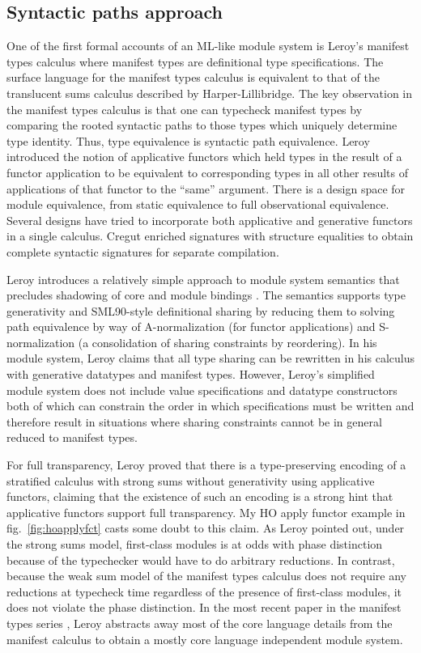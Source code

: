 \documentclass[12pt]{article}
\begin{document}
\subsection{Syntactic paths approach}
One of the first formal accounts of an ML-like module system is Leroy's manifest types calculus\cite{leroy94} where manifest types are definitional type specifications. The surface language for the manifest types calculus is equivalent to that of the translucent sums calculus described by Harper-Lillibridge. The key observation in the manifest types calculus is that one can typecheck manifest types by comparing the rooted syntactic paths to those types which uniquely determine type identity. Thus, type equivalence is syntactic path equivalence. Leroy introduced the notion of applicative functors which held types in the result of a functor application to be equivalent to corresponding types in all other results of applications of that functor to the ``same'' argument\cite{leroy95}. There is a design space for module equivalence, from static equivalence to full observational equivalence. Several designs \cite{shao99,dhc03,russothesis} have tried to incorporate both applicative and generative functors in a single calculus. Cregut \cite{CregutMacQueen94} enriched signatures with structure equalities to obtain complete syntactic signatures for separate compilation.

Leroy introduces a relatively simple approach to module system semantics that precludes shadowing of core and module bindings \cite{Leroy:generativity,leroy00}.
The semantics supports type generativity and SML90-style definitional sharing by reducing them to solving path equivalence by way of A-normalization (for functor applications) and S-normalization (a consolidation of sharing constraints by reordering). In his module system, Leroy claims that all type sharing can be rewritten in his calculus with generative datatypes and manifest types. However, Leroy's simplified module system does not include value specifications and datatype constructors both of which can constrain the order in which specifications must be written and therefore result in situations where sharing constraints cannot be in general reduced to manifest types. 

For full transparency, Leroy proved that there is a type-preserving encoding of a stratified calculus with strong sums without generativity using applicative functors\cite{leroy95}, claiming that the existence of such an encoding is a strong hint that applicative functors support full transparency. My HO apply functor example in fig.~\ref{fig:hoapplyfct} casts some doubt to this claim. As Leroy pointed out, under the strong sums model, first-class modules is at odds with phase distinction because of the typechecker would have to do arbitrary reductions\cite{leroy94}. In contrast, because the weak sum model of the manifest types calculus does not require any reductions at typecheck time regardless of the presence of first-class modules, it does not violate the phase distinction\cite{leroy94}. In the most recent paper in the manifest types series \cite{leroy00}, Leroy abstracts away most of the core language details from the manifest calculus to obtain a mostly core language independent module system. 
\end{document}
